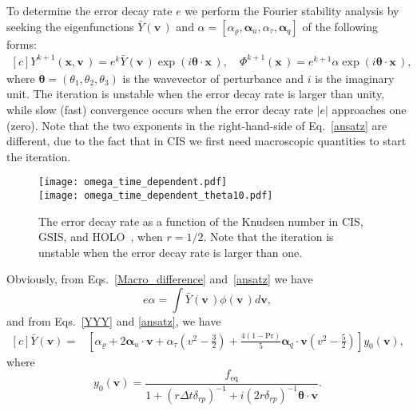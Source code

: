 \documentclass[onefignum,onetabnum]{siamart171218}
\begin{document}
To determine the error decay rate $e$ we perform the Fourier stability analysis by seeking the eigenfunctions $\bar{Y}(\bm{v}\,)$ and $\alpha=[\alpha_\varrho,\bm\alpha_{u},  \alpha_{\tau},\bm\alpha_{q}]$ of the following forms:
\begin{equation}\label{ansatz}
\begin{aligned}[c]
Y^{k+1}(\bm{x},\bm{v}\,)=e^{k}\bar{Y}(\bm{v}\,)\exp(i\bm{\theta}\cdot{\bm{x}}\,),\quad
\Phi^{k+1}(\bm{x}\,)=e^{k+1}\alpha\exp(i\bm{\theta}\cdot{\bm{x}}\,),
\end{aligned}
\end{equation}
where $\bm{\theta}=(\theta_1,\theta_2,\theta_3)$ is the wavevector of perturbance and $i$ is the imaginary unit. The iteration is unstable when the error decay rate is larger than unity, while slow (fast) convergence occurs when the error decay rate $|e|$ approaches one (zero). Note that the two exponents in the right-hand-side of Eq.~\eqref{ansatz} are different, due to the fact that in CIS we first need macroscopic quantities to start the iteration. 


\begin{figure}[t]
	\centering
	\texttt{[image: omega\_time\_dependent.pdf]}\\
	\texttt{[image: omega\_time\_dependent\_theta10.pdf]}
	\caption{
		The error decay rate as a function of the  Knudsen number in CIS, GSIS, and HOLO~\cite{Taitano2014}, when $r=1/2$. Note that the iteration is unstable when the error decay rate is larger than one. 
	}
	\label{fig:GSIS12_time_dependent}
\end{figure}






Obviously, from Eqs.~\eqref{Macro_difference} and~\eqref{ansatz} we have 
\begin{equation}\label{relation}
e\alpha=\int \bar{Y}(\bm{v}\,)\phi(\bm{v}\,)d\bm{v},
\end{equation}
and from Eqs.~\eqref{YYY} and \eqref{ansatz}, we have
\begin{equation}\label{y0_solution_CIS_time_dependent}
\begin{aligned}[c]
\bar{Y}(\bm{v})=&\left[ \alpha_\varrho+2\bm\alpha_{u}\cdot\bm{v}+\alpha_{\tau}\left(v^2-\frac{3}{2}\right)+\frac{4(1-\text{Pr})}{5}\bm\alpha_{q}\cdot\bm{v}\left({v}^2-\frac{5}{2}\right) \right] y_0(\bm{v}),
\end{aligned}
\end{equation}
where
\begin{equation}
y_0(\bm{v})=\frac{{f_\text{eq}}}{ 1+(r\Delta{t}\delta_{rp})^{-1}+i(2r\delta_{rp})^{-1}\bm{\theta}\cdot\bm{v} } .
\end{equation} 
\end{document}
